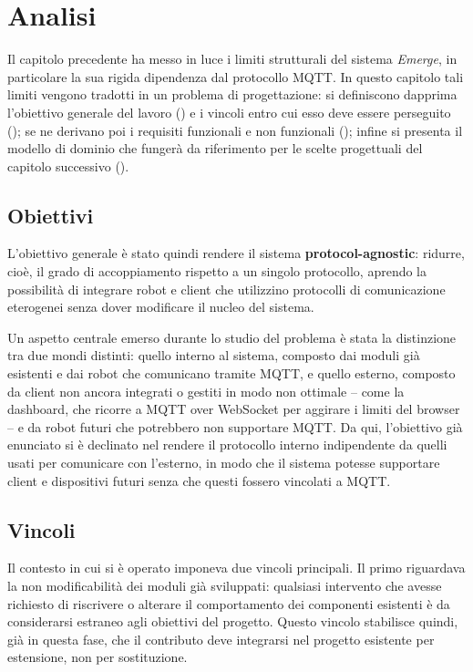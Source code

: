 \chapter{Analisi}
\label{chap:analisi}
%
Il capitolo precedente ha messo in luce i limiti strutturali del sistema \textit{Emerge}, in particolare la sua rigida dipendenza dal protocollo \ac{MQTT}. In questo capitolo tali limiti vengono tradotti in un problema di progettazione: si definiscono dapprima l'obiettivo generale del lavoro () e i vincoli entro cui esso deve essere perseguito (); se ne derivano poi i requisiti funzionali e non funzionali (); infine si presenta il modello di dominio che fungerà da riferimento per le scelte progettuali del capitolo successivo ().
%
\section{Obiettivi}
\label{sec:obiettivi}
%
L'obiettivo generale è stato quindi rendere il sistema \textbf{protocol-agnostic}: ridurre, cioè, il grado di accoppiamento rispetto a un singolo protocollo, aprendo la possibilità di integrare robot e client che utilizzino protocolli di comunicazione eterogenei senza dover modificare il nucleo del sistema.

Un aspetto centrale emerso durante lo studio del problema è stata la distinzione tra due mondi distinti: quello interno al sistema, composto dai moduli già esistenti e dai robot che comunicano tramite \ac{MQTT}, e quello esterno, composto da client non ancora integrati o gestiti in modo non ottimale -- come la dashboard, che ricorre a \ac{MQTT} over WebSocket per aggirare i limiti del browser -- e da robot futuri che potrebbero non supportare \ac{MQTT}. Da qui, l'obiettivo già enunciato si è declinato nel rendere il protocollo interno indipendente da quelli usati per comunicare con l'esterno, in modo che il sistema potesse supportare client e dispositivi futuri senza che questi fossero vincolati a \ac{MQTT}.
%
\section{Vincoli}
\label{sec:vincoli}
Il contesto in cui si è operato imponeva due vincoli principali. Il primo riguardava la non modificabilità dei moduli già sviluppati: qualsiasi intervento che avesse richiesto di riscrivere o alterare il comportamento dei componenti esistenti è da considerarsi estraneo agli obiettivi del progetto. Questo vincolo stabilisce quindi, già in questa fase, che il contributo deve integrarsi nel progetto esistente per estensione, non per sostituzione.

